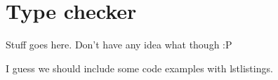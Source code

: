 \chapter{Type checker}
Stuff goes here. Don't have any idea what though :P

I guess we should include some code examples with lstlistings.
